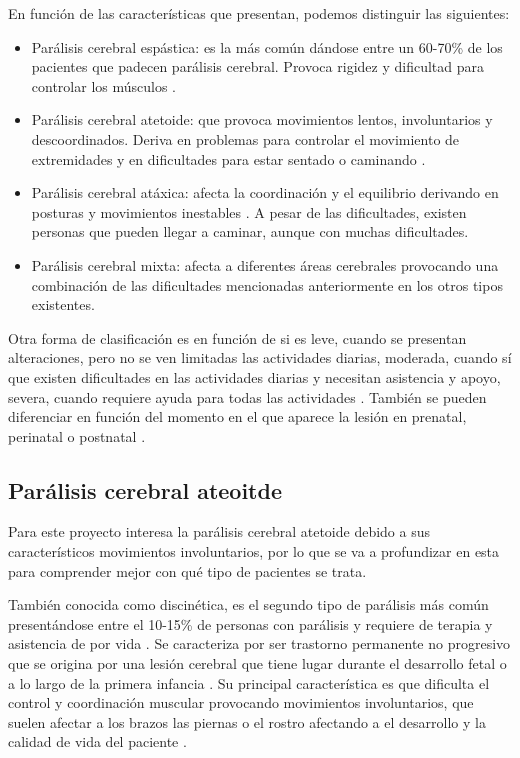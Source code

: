 En función de las características que presentan, podemos distinguir las siguientes:
\begin{itemize}
    \item Parálisis cerebral espástica: es la más común dándose entre un 60-70\% de los pacientes que padecen parálisis cerebral. Provoca rigidez y dificultad para controlar los músculos \cite{ASPACE, ASPACEGalicia2024}. 
    \item Parálisis cerebral atetoide: que provoca movimientos lentos, involuntarios y descoordinados. Deriva en problemas para controlar el movimiento de extremidades y en dificultades para estar sentado o caminando \cite{ASPACE, MedlinePlus2024}.
    \item Parálisis cerebral atáxica: afecta la coordinación y el equilibrio derivando en posturas y movimientos inestables \cite{eFISIO2023}. A pesar de las dificultades, existen personas que pueden llegar a caminar, aunque con muchas dificultades.
    \item Parálisis cerebral mixta: afecta a diferentes áreas cerebrales provocando una combinación de las dificultades mencionadas anteriormente en los otros tipos existentes.
\end{itemize}

Otra forma de clasificación es en función de si es leve, cuando se presentan alteraciones, pero no se ven limitadas las actividades diarias, moderada, cuando sí que existen dificultades en las actividades diarias y necesitan asistencia y apoyo, severa, cuando requiere ayuda para todas las actividades \cite{ASPACE}. También se pueden diferenciar en función del momento en el que aparece la lesión en prenatal, perinatal o postnatal \cite{ValldHebron2026}.


\subsection{Parálisis cerebral ateoitde}

Para este proyecto interesa la parálisis cerebral atetoide debido a sus característicos movimientos involuntarios, por lo que se va a profundizar en esta para comprender mejor con qué tipo de pacientes se trata.

También conocida como discinética, es el segundo tipo de parálisis más común presentándose entre el 10-15\% de personas con parálisis y requiere de terapia y asistencia de por vida \cite{PercyMartnez2025}. Se caracteriza por ser trastorno permanente no progresivo que se origina por una lesión cerebral que tiene lugar durante el desarrollo fetal o a lo largo de la primera infancia \cite{Li2022}. Su principal característica es que dificulta el control y coordinación muscular provocando movimientos involuntarios, que suelen afectar a los brazos las piernas o el rostro afectando a el desarrollo y la calidad de vida del paciente \cite{eFISIO2022}.


